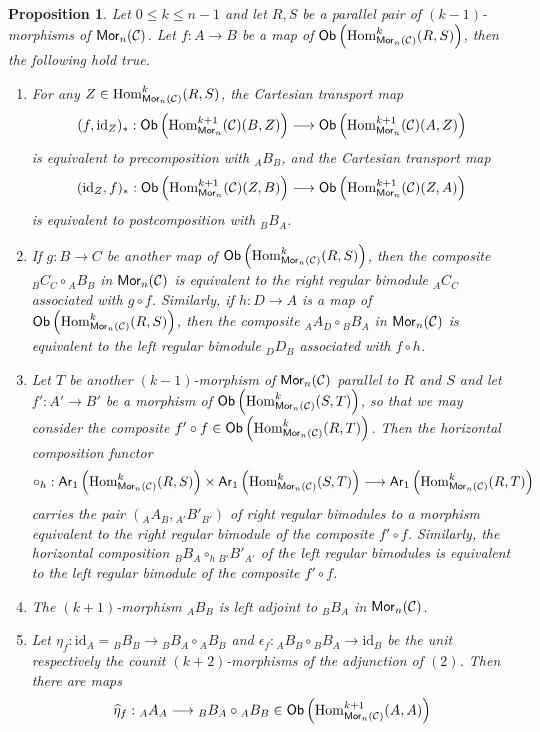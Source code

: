\documentclass[10pt, reqno, twoside
, final
]{amsart}
\numberwithin{equation}{subsection}%
\theoremstyle{definition}
\theoremstyle{definition}
\theoremstyle{definition}
\theoremstyle{definition}
\theoremstyle{definition}
\theoremstyle{definition}
\theoremstyle{definition}
\theoremstyle{definition}
\theoremstyle{definition}
\theoremstyle{plain}
\theoremstyle{definition}
\theoremstyle{plain}
\theoremstyle{definition}
\theoremstyle{plain}
\theoremstyle{definition}
\theoremstyle{definition}
\theoremstyle{plain}
\theoremstyle{plain}
\theoremstyle{definition}
\theoremstyle{plain}
\theoremstyle{plain}
\newtheorem{prop}[defn]{Proposition}
\theoremstyle{plain}
\begin{document}
\begin{prop}\label{prop:regularbimodajoint}
Let $0\leq k\leq n-1$ and let $R,S$ be a parallel pair of $(k-1)$-morphisms of $\mathsf{Mor}_n(\mathcal{C})$. Let $f:A\rightarrow B$ be a map of $\mathsf{Ob}\left(\mathrm{Hom}^k_{\mathsf{Mor}_n(\mathcal{C})}(R,S)\right)$, then the following hold true. 
\begin{enumerate}[$(1)$]
    \item For any $Z\in \mathrm{Hom}_{\mathsf{Mor}_n(\mathcal{C})}^k(R,S)$, the Cartesian transport map 
    \[  (f,\mathrm{id}_Z)_*:\mathsf{Ob}\left(\mathrm{Hom}^{k+1}_{\mathsf{Mor}_n}(\mathcal{C})(B,Z)\right) \longrightarrow \mathsf{Ob}\left(\mathrm{Hom}^{k+1}_{\mathsf{Mor}_n}(\mathcal{C})(A,Z)\right)  \]
    is equivalent to precomposition with ${}_AB_B$, and the Cartesian transport map 
    \[  (\mathrm{id}_Z,f)_*: \mathsf{Ob}\left(\mathrm{Hom}^{k+1}_{\mathsf{Mor}_n}(\mathcal{C})(Z,B)\right) \longrightarrow \mathsf{Ob}\left(\mathrm{Hom}^{k+1}_{\mathsf{Mor}_n}(\mathcal{C})(Z,A)\right)  \]
    is equivalent to postcomposition with ${}_BB_A$.
    \item If $g:B\rightarrow C$ be another map of $\mathsf{Ob}\left(\mathrm{Hom}^k_{\mathsf{Mor}_n(\mathcal{C})}(R,S)\right)$, then the composite $ {}_BC_{C}\circ {}_AB_B$ in $\mathsf{Mor}_n(\mathcal{C})$ is equivalent to the right regular bimodule ${}_AC_{C}$ associated with $g\circ f$. Similarly, if $h:D\rightarrow A$ is a map of $\mathsf{Ob}\left(\mathrm{Hom}^k_{\mathsf{Mor}_n(\mathcal{C})}(R,S)\right)$, then the composite $ {}_AA_{D}\circ {}_BB_A$ in $\mathsf{Mor}_n(\mathcal{C})$ is equivalent to the left regular bimodule ${}_DD_{B}$ associated with $f\circ h$.  
    \item Let $T$ be another $(k-1)$-morphism of $\mathsf{Mor}_n(\mathcal{C})$ parallel to $R$ and $S$ and let $f':A'\rightarrow B'$ be a morphism of $\mathsf{Ob}\left(\mathrm{Hom}^{k}_{\mathsf{Mor}_n(\mathcal{C})}(S,T)\right)$, so that we may consider the composite $f'\circ f\in\mathsf{Ob}\left(\mathrm{Hom}^{k}_{\mathsf{Mor}_n(\mathcal{C})}(R,T)\right)$. Then the horizontal composition functor
    \[  \circ_h: \mathsf{Ar}_1\left(\mathrm{Hom}^{k}_{\mathsf{Mor}_n(\mathcal{C})}(R,S)\right) \times  \mathsf{Ar}_1\left(\mathrm{Hom}^{k}_{\mathsf{Mor}_n(\mathcal{C})}(S,T)\right)\longrightarrow  \mathsf{Ar}_1\left(\mathrm{Hom}^{k}_{\mathsf{Mor}_n(\mathcal{C})}(R,T)\right)  \]
    carries the pair $({}_AA_B,{}_{A'}B'_{B'})$ of right regular bimodules to a morphism equivalent to the right regular bimodule of the composite $f'\circ f$. Similarly, the horizontal composition ${}_BB_A\circ_h {}_{B'}B'_{A'}$ of the left regular bimodules is equivalent to the left regular bimodule of the composite $f'\circ f$.
    \item The $(k+1)$-morphism ${}_AB_{B}$ is left adjoint to ${}_BB_{A}$ in $\mathsf{Mor}_n(\mathcal{C})$. 
    \item Let $\eta_f:\mathrm{id}_A={}_BB_{B}\rightarrow {}_BB_{A}\circ {}_AB_B$ and $\epsilon_f:{}_AB_B\circ {}_BB_{A}\rightarrow \mathrm{id}_B$ be the unit respectively the counit $(k+2)$-morphisms of the adjunction of $(2)$. Then there are maps \[\widehat{\eta}_f:{}_AA_{A}\longrightarrow {}_BB_{A}\circ {}_AB_B\in \mathsf{Ob}\left(\mathrm{Hom}^{k+1}_{\mathsf{Mor}_n(\mathcal{C})}(A,A)\right)\]

\end{enumerate}
\end{prop}
\end{document}
